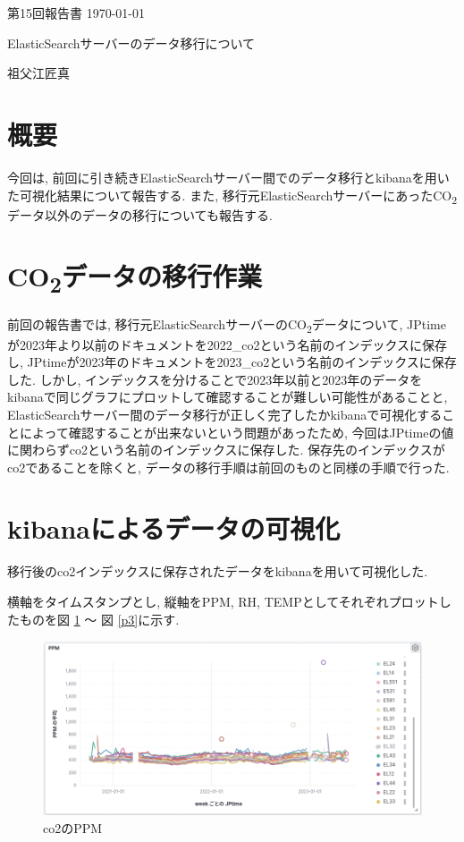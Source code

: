 \documentclass[a4j,12pt,]{jarticle}
\begin{document}
{\noindent\small 第15回報告書 \hfill\today}
\begin{center}
  {\Large ElasticSearchサーバーのデータ移行について}
\end{center}
\begin{flushright}
  祖父江匠真 \\
\end{flushright}

\section{概要}
今回は, 前回に引き続きElasticSearchサーバー間でのデータ移行とkibanaを用いた可視化結果について報告する.
また, 移行元ElasticSearchサーバーにあったCO\textsubscript{2}データ以外のデータの移行についても報告する.

\section{CO\textsubscript{2}データの移行作業}
前回の報告書では, 移行元ElasticSearchサーバーのCO\textsubscript{2}データについて, JPtimeが2023年より以前のドキュメントを2022\_co2という名前のインデックスに保存し, JPtimeが2023年のドキュメントを2023\_co2という名前のインデックスに保存した.
しかし, インデックスを分けることで2023年以前と2023年のデータをkibanaで同じグラフにプロットして確認することが難しい可能性があることと, ElasticSearchサーバー間のデータ移行が正しく完了したかkibanaで可視化することによって確認することが出来ないという問題があったため, 今回はJPtimeの値に関わらずco2という名前のインデックスに保存した.
保存先のインデックスがco2であることを除くと, データの移行手順は前回のものと同様の手順で行った.

\section{kibanaによるデータの可視化}

移行後のco2インデックスに保存されたデータをkibanaを用いて可視化した.

横軸をタイムスタンプとし, 縦軸をPPM, RH, TEMPとしてそれぞれプロットしたものを図 \ref{p1} 〜 図 \ref{p3}に示す.

\begin{figure}[H]
  \begin{center}
    \includegraphics[width=160mm]{ppm.png}
    \caption{co2のPPM}
    \label{p1}
  \end{center}
\end{figure}
\end{document}
